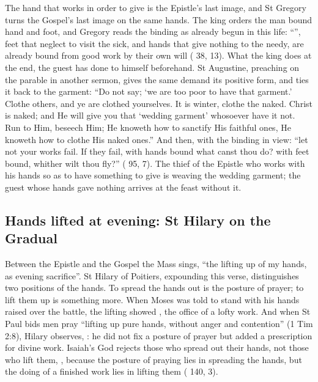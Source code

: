 The hand that works in order to give is the Epistle's last image, and St
Gregory turns the Gospel's last image on the same hands. The king orders the
man bound hand and foot, and Gregory reads the binding as already begun in
this life: ``'', feet that
neglect to visit the sick, and hands that give nothing to the needy, are
already bound from good work by their own will (
38, 13). What the king does at the end, the guest has done to himself
beforehand. St Augustine, preaching on the parable in another sermon, gives the
same demand its positive form, and ties it back to the garment: ``Do not say;
`we are too poor to have that garment.' Clothe others, and ye are clothed
yourselves. It is winter, clothe the naked. Christ is naked; and He will give
you that `wedding garment' whosoever have it not. Run to Him, beseech Him; He
knoweth how to sanctify His faithful ones, He knoweth how to clothe His naked
ones.'' And then, with the binding in view: ``let not your works fail. If they
fail, with hands bound what canst thou do? with feet bound, whither wilt thou
fly?'' ( 95, 7). The thief of the Epistle who works with his hands
so as to have something to give is weaving the wedding garment; the guest whose hands gave nothing arrives at the feast without it.

\subsection{Hands lifted at evening: St Hilary on the Gradual}

Between the Epistle and the Gospel the Mass sings, ``the lifting up of my
hands, as evening sacrifice''. St Hilary of Poitiers, expounding this verse,
distinguishes two positions of the hands. To spread the hands out is the
posture of prayer; to lift them up is something more. When Moses was told to
stand with his hands raised over the battle, the lifting showed , the office of a lofty work. And when St Paul bids men pray
``lifting up pure hands, without anger and contention'' (1 Tim 2:8), Hilary
observes, : he did not fix a posture of prayer but added a
prescription for divine work. Isaiah's God rejects those who spread out their
hands, not those who lift them, , because
the posture of praying lies in spreading the hands, but the doing of a
finished work lies in lifting them ( 140, 3).

